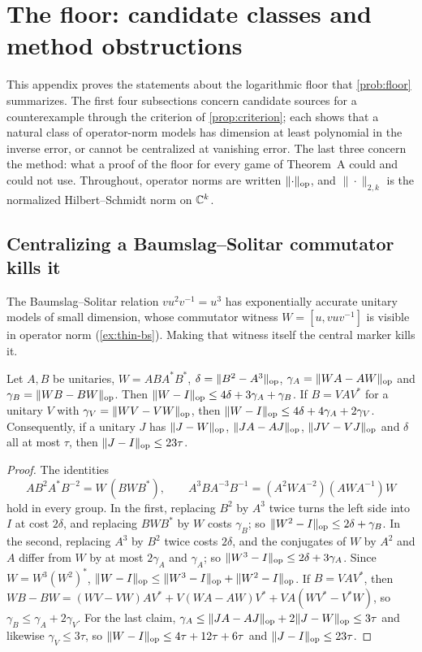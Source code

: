 \section{The floor: candidate classes and method obstructions}\label{app:floor}

This appendix proves the statements about the logarithmic floor that \cref{prob:floor} summarizes. The first four subsections
concern candidate sources for a counterexample through the criterion of \cref{prop:criterion}; each shows that a natural class
of operator-norm models has dimension at least polynomial in the inverse error, or cannot be centralized at vanishing error. The
last three concern the method: what a proof of the floor for every game of Theorem~A could and could not use. Throughout,
operator norms are written $\lVert \cdot\rVert_{\mathrm{op}}$, and $\|\cdot\|_{2,k}$ is the normalized Hilbert--Schmidt norm on $\mathbb C^k$.

\subsection{Centralizing a Baumslag--Solitar commutator kills it}\label{app:floor-bs}

The Baumslag--Solitar relation $vu^2v^{-1}=u^3$ has exponentially accurate unitary models of small dimension, whose commutator
witness $W=[u,vuv^{-1}]$ is visible in operator norm (\cref{ex:thin-bs}). Making that witness itself the central marker kills it.

\begin{proposition}\label{prop:bs-central}
Let $A,B$ be unitaries, $W=ABA^*B^*$, $\delta=\lVert B^2-A^3\rVert_{\mathrm{op}}$, $\gamma_A=\lVert WA-AW\rVert_{\mathrm{op}}$ and $\gamma_B=\lVert WB-BW\rVert_{\mathrm{op}}$. Then
$\lVert W-I\rVert_{\mathrm{op}}\le4\delta+3\gamma_A+\gamma_B$. If $B=VAV^*$ for a unitary $V$ with $\gamma_V=\lVert WV-VW\rVert_{\mathrm{op}}$, then
$\lVert W-I\rVert_{\mathrm{op}}\le4\delta+4\gamma_A+2\gamma_V$. Consequently, if a unitary $J$ has $\lVert J-W\rVert_{\mathrm{op}}$, $\lVert JA-AJ\rVert_{\mathrm{op}}$, $\lVert JV-VJ\rVert_{\mathrm{op}}$ and $\delta$ all at
most $\tau$, then $\lVert J-I\rVert_{\mathrm{op}}\le23\tau$.
\end{proposition}

\begin{proof}
The identities
\[
AB^2A^*B^{-2}=W\,(BWB^*),\qquad A^3BA^{-3}B^{-1}=(A^2WA^{-2})(AWA^{-1})W
\]
hold in every group. In the first, replacing $B^2$
by $A^3$ twice turns the left side into $I$ at cost $2\delta$, and replacing $BWB^*$ by $W$ costs $\gamma_B$; so
$\lVert W^2-I\rVert_{\mathrm{op}}\le2\delta+\gamma_B$. In the second, replacing $A^3$ by $B^2$ twice costs $2\delta$, and the conjugates of $W$ by $A^2$ and $A$
differ from $W$ by at most $2\gamma_A$ and $\gamma_A$; so $\lVert W^3-I\rVert_{\mathrm{op}}\le2\delta+3\gamma_A$. Since $W=W^3(W^2)^*$,
$\lVert W-I\rVert_{\mathrm{op}}\le\lVert W^3-I\rVert_{\mathrm{op}}+\lVert W^2-I\rVert_{\mathrm{op}}$. If $B=VAV^*$, then
$WB-BW=(WV-VW)AV^*+V(WA-AW)V^*+VA(WV^*-V^*W)$, so $\gamma_B\le\gamma_A+2\gamma_V$. For the last claim, $\gamma_A\le\lVert JA-AJ\rVert_{\mathrm{op}}+2\lVert J-W\rVert_{\mathrm{op}}
\le3\tau$ and likewise $\gamma_V\le3\tau$, so $\lVert W-I\rVert_{\mathrm{op}}\le4\tau+12\tau+6\tau$ and $\lVert J-I\rVert_{\mathrm{op}}\le23\tau$.
\end{proof}

